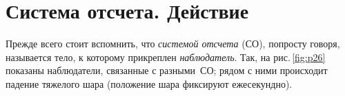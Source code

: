 \documentclass[main.tex]{subfiles}
\begin{document}



\pagestyle{empty}

 

\setcounter{section}{13
}
\addtocounter{section}{-1} 

\section{Система отсчета. Действие}

Прежде всего стоит вспомнить, что \emph{системой отсчета} (СО), попросту говоря, называется тело, к которому прикреплен \emph{наблюдатель}. Так, на рис.\,\ref{fig:p26} показаны наблюдатели, связанные с разными~СО; рядом с ними происходит падение тяжелого шара (положение шара фиксируют ежесекундно).
\end{document}
